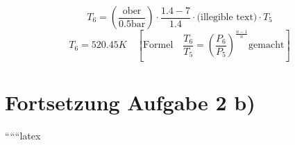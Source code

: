 

\item[b)] 
    \[
    T_6 = \left( \frac{\text{ober}}{0.5 \text{bar}} \right) \cdot \frac{1.4 - 7}{1.4} \cdot \text{(illegible text)} \cdot T_5
    \]
    \[
    T_6 = 520.45 K \quad \left[ \text{Formel} \quad \frac{T_6}{T_5} = \left( \frac{P_6}{P_5} \right)^{\frac{n-1}{n}} \text{gemacht} \right]
    \]

\section*{Fortsetzung Aufgabe 2 b)}

``````latex
